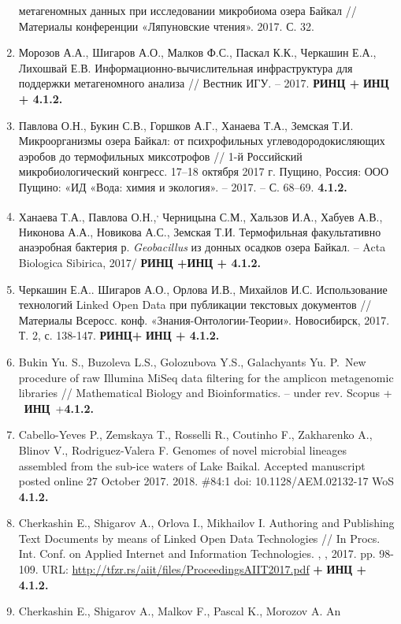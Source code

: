 \documentclass[a4paper,12pt,openany,final]{extreport}
\begin{document}
\begin{enumerate}
  метагеномных данных при исследовании микробиома озера Байкал //
  Материалы конференции «Ляпуновские чтения». 2017. С. 32.
\item
  Морозов А.А., Шигаров А.О., Малков Ф.С., Паскал К.К., Черкашин Е.А.,
  Лихошвай Е.В. Информационно-вычислительная инфраструктура для
  поддержки метагеномного анализа // Вестник ИГУ. -- 2017. \textbf{РИНЦ
  +} \textbf{ИНЦ + 4.1.2.}
\item
  Павлова О.Н., Букин С.В., Горшков А.Г., Ханаева Т.А., Земская Т.И.
  Микроорганизмы озера Байкал: от психрофильных углеводородокисляющих
  аэробов до термофильных миксотрофов // 1-й Российский
  микробиологический конгресс. 17--18 октября 2017 г. Пущино, Россия:
  ООО Пущино: «ИД «Вода: химия и экология». -- 2017. -- С. 68--69.
  \textbf{4.1.2.}
\item
  Ханаева Т.А., Павлова О.Н.,\textsuperscript{,} Черницына С.М., Хальзов
  И.А., Хабуев А.В., Никонова А.А., Новикова А.С., Земская Т.И.
  Термофильная факультативно анаэробная бактерия р. \emph{Geobacillus}
  из донных осадков озера Байкал. -- Acta Biologica Sibirica, 2017/
  \textbf{РИНЦ +ИНЦ + 4.1.2.} ~
\item
  Черкашин Е.А.. Шигаров А.О., Орлова И.В., Михайлов И.С. Использование
  технологий Linked Open Data при публикации текстовых документов //
  Материалы Всеросс. конф. «Знания-Онтологии-Теории». Новосибирск, 2017.
  Т. 2, с. 138-147. \textbf{РИНЦ+} \textbf{ИНЦ + 4.1.2.}
\item
  Bukin Yu. S., Buzoleva L.S., Golozubova Y.S., Galachyants Yu. P.~New
  procedure of raw Illumina MiSeq data filtering for the amplicon
  metagenomic libraries // Mathematical Biology and Bioinformatics. --
  under rev. Scopus + ~\textbf{ИНЦ}~+\textbf{4.1.2.}
\item
  Cabello-Yeves P., Zemskaya T., Rosselli R., Coutinho F., Zakharenko
  A., Blinov V., Rodriguez-Valera F. Genomes of novel microbial lineages
  assembled from the sub-ice waters of Lake Baikal. Accepted manuscript
  posted online 27 October 2017. 2018. \#84:1 doi: 10.1128/AEM.02132-17
  WoS \textbf{4.1.2.}
\item
  Cherkashin E., Shigarov A., Orlova I., Mikhailov I. Authoring and
  Publishing Text Documents by means of Linked Open Data Technologies //
  In Procs. Int. Conf. on Applied Internet and Information Technologies.
  , , 2017. pp. 98-109. URL:
  \url{http://tfzr.rs/aiit/files/ProceedingsAIIT2017.pdf} \textbf{+}
  \textbf{ИНЦ + 4.1.2.}
\item
  Cherkashin E., Shigarov A., Malkov F., Pascal K., Morozov A. An

\end{enumerate}
\end{document}
